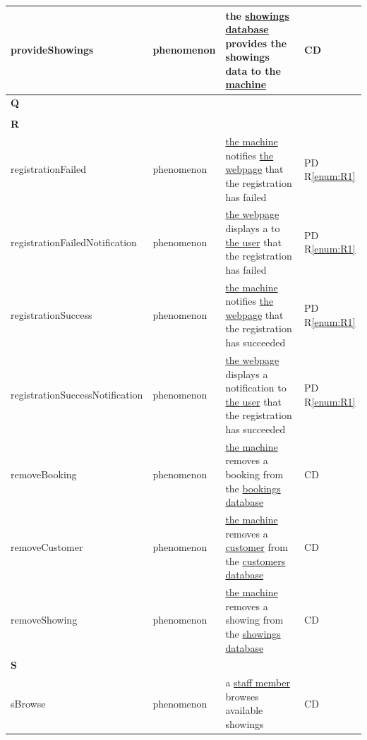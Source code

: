 \documentclass[a4paper,10pt,titlepage,bibtotoc,bibtotocnumbered]{scrreprt}
\begin{document}
\begin{longtable}{|l|p{3cm}|p{5cm}|l|}
\hline
\hypertarget{glossary:provideShowings}{provideShowings} & phenomenon & the \hyperlink{glossary:ShowingsDatabase}{showings database} provides the showings data to the \hyperlink{glossary:UDEKino}{machine} & CD\\
\hline
\multicolumn{4}{|l|}{\textbf{Q}}\\
\hline
&  &  & \\
\hline
\multicolumn{4}{|l|}{\textbf{R}}\\
\hline
\hypertarget{glossary:registrationFailed}{registrationFailed} & phenomenon & \hyperlink{glossary:UDEKino}{the machine} notifies \hyperlink{glossary:WebpageRegisterCustomer}{the webpage} that the registration has failed & PD R\ref{enum:R1}\\
\hline
\hypertarget{glossary:registrationFailedNotification}{registrationFailedNotification} & phenomenon & \hyperlink{glossary:WebpageRegisterCustomer}{the webpage} displays a to \hyperlink{glossary:User}{the user} that the registration has failed & PD R\ref{enum:R1}\\
\hline
\hypertarget{glossary:registrationSuccess}{registrationSuccess} & phenomenon & \hyperlink{glossary:UDEKino}{the machine} notifies \hyperlink{glossary:WebpageRegisterCustomer}{the webpage} that the registration has succeeded & PD R\ref{enum:R1}\\
\hline
\hypertarget{glossary:registrationSuccessNotification}{registrationSuccessNotification} & phenomenon & \hyperlink{glossary:WebpageRegisterCustomer}{the webpage} displays a notification to \hyperlink{glossary:User}{the user} that the registration has succeeded & PD R\ref{enum:R1}\\
\hline
\hypertarget{glossary:removeBooking}{removeBooking} & phenomenon &  \hyperlink{glossary:UDEKino}{the machine} removes a booking from the \hyperlink{glossary:BookingsDatabase}{bookings database} & CD\\
\hline
\hypertarget{glossary:removeBooking}{removeCustomer} & phenomenon &  \hyperlink{glossary:UDEKino}{the machine} removes a \hyperlink{glossary:Customer}{customer} from the \hyperlink{glossary:CustomersDatabase}{customers database} & CD\\
\hline
\hypertarget{glossary:Showing}{removeShowing} & phenomenon &  \hyperlink{glossary:UDEKino}{the machine} removes a showing from the \hyperlink{glossary:ShowingsDatabase}{showings database} & CD\\
\hline
\multicolumn{4}{|l|}{\textbf{S}}\\
\hline
\hypertarget{glossary:sBrowse}{sBrowse} & phenomenon & a \hyperlink{glossary:StaffMember}{staff member} browses available showings & CD\\

\end{longtable}
\end{document}
